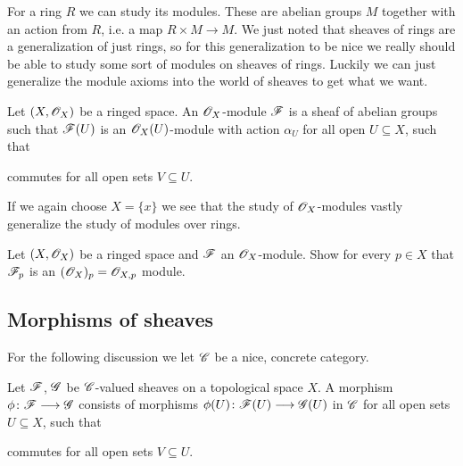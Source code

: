 For a ring $R$ we can study its modules. These are abelian groups $M$ together with an action from $R$, i.e. a map $R\times M\longrightarrow M$. We just noted that sheaves of rings are a generalization of just rings, so for this generalization to be nice we really should be able to study some sort of modules on sheaves of rings. Luckily we can just generalize the module axioms into the world of sheaves to get what we want. 

\begin{definition}[$\O_X$-modules]
Let $(X, \mathscr{O}_X)$ be a ringed space. An $\O_X$-module $\mathscr{F}$ is a sheaf of abelian groups such that $\mathscr{F}(U)$ is an $\mathscr{O}_X(U)$-module with action $\alpha_U$ for all open $U\subseteq X$, such that 
\begin{center}
\end{center}
commutes for all open sets $V\subseteq U$. 
\end{definition}

If we again choose $X=\{x\}$ we see that the study of $\O_X$-modules vastly generalize the study of modules over rings. 

\begin{problem}
Let $(X, \mathscr{O}_X)$ be a ringed space and $\mathscr{F}$ an $\O_X$-module. Show for every $p\in X$ that $\mathscr{F}_p$ is an $(\mathscr{O}_X)_p = \mathscr{O}_{X, p}$ module. 
\end{problem}



\subsection{Morphisms of sheaves}

For the following discussion we let $\mathscr{C}$ be a nice, concrete category. 

\begin{definition}
Let $\mathscr{F}$, $\mathscr{G}$ be $\mathscr{C}$-valued sheaves on a topological space $X$. A morphism $\phi\colon\mathscr{F}\longrightarrow\mathscr{G}$ consists of morphisms $\phi(U)\colon\mathscr{F}(U)\longrightarrow\mathscr{G}(U)$ in $\mathscr{C}$ for all open sets $U\subseteq X$, such that 
\begin{center}
\end{center}
commutes for all open sets $V\subseteq U$. 
\end{definition}

